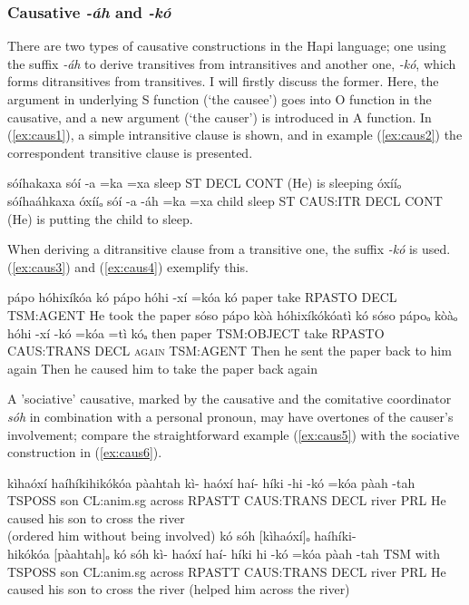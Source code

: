 \documentclass[a4paper, 12pt, oneside]{memoir}
\newcommand{\emh}[1]{\textit{#1}}
\begin{document}
\subsubsection{Causative \emh{-áh} and \emh{-kó}}\label{s:caus}
There are two types of causative constructions in the Hapi language; one using the suffix \emh{-áh} to derive transitives from intransitives and another one, \emh{-kó}, which forms ditransitives from transitives. I will firstly discuss the former. Here, the argument in underlying S function (`the causee') goes into O function in the causative, and a new argument (`the causer') is introduced in A function. In (\ref{ex:caus1}), a simple intransitive clause is shown, and in example (\ref{ex:caus2}) the correspondent transitive clause is presented.
\begin{examples}
    \ex \label{ex:caus1}
    \words sóíhakaxa
    \bits sóí -a =ka =xa
    \gloss sleep ST DECL CONT
    \tr (He) is sleeping
    \ex \label{ex:caus2}
    \words óxííₒ sóíhaáhkaxa
    \bits óxííₒ sóí -a -áh =ka =xa
    \gloss child sleep ST CAUS:ITR DECL CONT 
    \tr (He) is putting the child to sleep.
\end{examples}
When deriving a ditransitive clause from a transitive one, the suffix \emh{-kó} is used. (\ref{ex:caus3}) and (\ref{ex:caus4}) exemplify this.
\begin{examples}
    \ex \label{ex:caus3}
    \words pápo hóhixíkóa kó
    \bits pápo hóhi -xí =kóa kó
    \gloss paper take RPASTO DECL TSM:AGENT
    \tr He took the paper
    \ex \label{ex:caus4}
    \words sóso pápo kòà hóhixíkókóatì kó
    \bits sóso pápoₒ kòàₒ hóhi -xí -kó =kóa =tì kóₐ 
    \gloss then paper TSM:OBJECT take RPASTO CAUS:TRANS DECL \textsc{\textup{again}} TSM:AGENT
    \tr Then he sent the paper back to him again
    \tr Then he caused him to take the paper back again
\end{examples}
A 'sociative' causative, marked by the causative and the comitative coordinator \emh{sóh} in combination with a personal pronoun, may have overtones of the causer's involvement; compare the straightforward example (\ref{ex:caus5}) with the sociative construction in (\ref{ex:caus6}).
\begin{examples}
    \ex \label{ex:caus5}
    \words kìhaóxí haíhíkihikókóa pàahtah
    \bits kì- haóxí haí- híki -hi -kó =kóa pàah -tah
    \gloss TSPOSS son CL:anim.sg across RPASTT CAUS:TRANS DECL river PRL 
    \tr He caused his son to cross the river \\ (ordered him without being involved)
    \ex \label{ex:caus6}
    \words kó sóh [kìhaóxí]ₒ haíhíki- \\ hikókóa [pàahtah]ₒ
    \bits kó sóh kì- haóxí haí- híki hi -kó =kóa pàah -tah 
    \gloss TSM with TSPOSS son CL:anim.sg across RPASTT CAUS:TRANS DECL river PRL
    \tr He caused his son to cross the river (helped him across the river)
\end{examples}
\end{document}
